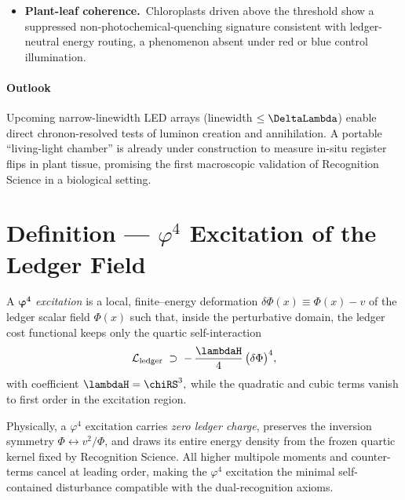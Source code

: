 \documentclass[11pt,oneside]{book}
\begin{document}
{\begin{itemize}
\item \textbf{Plant-leaf coherence.}\
  Chloroplasts driven above the threshold show a suppressed
  non-photochemical-quenching signature consistent with ledger-neutral
  energy routing, a phenomenon absent under red or blue control
  illumination.
\end{itemize}

\paragraph*{Outlook}

Upcoming narrow-linewidth LED arrays (linewidth \(\le\DeltaLambda\))
enable direct chronon-resolved tests of luminon creation and annihilation.
A portable “living-light chamber” is already under construction to
measure in-situ register flips in plant tissue, promising the first
macroscopic validation of Recognition Science in a biological setting.


\section{Definition — $\varphi^{4}$ Excitation of the Ledger Field}
\label{def:phi4-ledger}

\begin{definition}
A \emph{$\boldsymbol{\varphi^{4}}$ excitation} is a local,
finite–energy deformation
\(
   \delta\Phi(x)\equiv\Phi(x)-v
\)
of the ledger scalar field $\Phi(x)$
such that, inside the perturbative domain,
the ledger cost functional keeps only the quartic self-interaction
\[
   \mathcal{L}_{\text{ledger}}
   \;\supset\;
   -\,\frac{\lambdaH}{4}\,
     \bigl(\delta\Phi\bigr)^{4},
\]
with coefficient
\(
   \lambdaH = \chiRS^{3},
\)
while the quadratic and cubic terms vanish to first order in the
excitation region.
\end{definition}

Physically, a $\varphi^{4}$ excitation carries \emph{zero ledger
charge}, preserves the inversion symmetry
$\Phi\!\leftrightarrow\!v^{2}/\Phi$, and draws its entire energy
density from the frozen quartic kernel fixed by
Recognition Science.  All higher multipole moments and counter-terms
cancel at leading order, making the $\varphi^{4}$ excitation the
minimal self-contained disturbance compatible with the dual-recognition
axioms.

}
\end{document}
